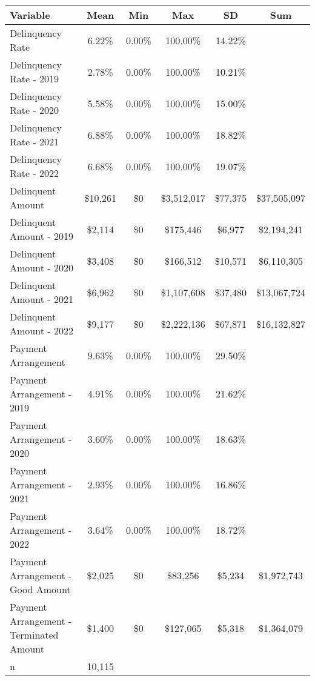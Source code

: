 \begin{tabular}{l|c|c|c|c|c}
\toprule 
\midrule 
Variable & Mean & Min & Max & SD & Sum \\
\midrule 
Delinquency Rate & 6.22\% & 0.00\% & 100.00\% & 14.22\% \\
\quad Delinquency Rate - 2019 & 2.78\% & 0.00\% & 100.00\% & 10.21\% \\
\quad Delinquency Rate - 2020 & 5.58\% & 0.00\% & 100.00\% & 15.00\% \\
\quad Delinquency Rate - 2021 & 6.88\% & 0.00\% & 100.00\% & 18.82\% \\
\quad Delinquency Rate - 2022 & 6.68\% & 0.00\% & 100.00\% & 19.07\% \\
\midrule 
Delinquent Amount & \$10,261 & \$0 & \$3,512,017 & \$77,375 & \$37,505,097 \\
\quad Delinquent Amount - 2019 & \$2,114 & \$0 & \$175,446 & \$6,977 & \$2,194,241 \\
\quad Delinquent Amount - 2020 & \$3,408 & \$0 & \$166,512 & \$10,571 & \$6,110,305 \\
\quad Delinquent Amount - 2021 & \$6,962 & \$0 & \$1,107,608 & \$37,480 & \$13,067,724 \\
\quad Delinquent Amount - 2022 & \$9,177 & \$0 & \$2,222,136 & \$67,871 & \$16,132,827 \\
\midrule 
Payment Arrangement & 9.63\% & 0.00\% & 100.00\% & 29.50\% \\
\quad Payment Arrangement - 2019 & 4.91\% & 0.00\% & 100.00\% & 21.62\% \\
\quad Payment Arrangement - 2020 & 3.60\% & 0.00\% & 100.00\% & 18.63\% \\
\quad Payment Arrangement - 2021 & 2.93\% & 0.00\% & 100.00\% & 16.86\% \\
\quad Payment Arrangement - 2022 & 3.64\% & 0.00\% & 100.00\% & 18.72\% \\
\quad Payment Arrangement - Good Amount & \$2,025 & \$0 & \$83,256 & \$5,234 & \$1,972,743 \\
\quad Payment Arrangement - Terminated Amount & \$1,400 & \$0 & \$127,065 & \$5,318 & \$1,364,079 \\
\midrule 
n & 10,115 &  &  &  &  \\
\midrule 
\bottomrule 
\end{tabular}
